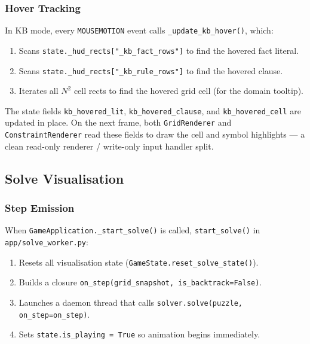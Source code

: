 \subsubsection{Hover Tracking}

In KB mode, every \texttt{MOUSEMOTION} event calls
\texttt{\_update\_kb\_hover()}, which:
\begin{enumerate}
  \item Scans \texttt{state.\_hud\_rects["\_kb\_fact\_rows"]} to find
        the hovered fact literal.
  \item Scans \texttt{state.\_hud\_rects["\_kb\_rule\_rows"]} to find
        the hovered clause.
  \item Iterates all $N^2$ cell rects to find the hovered grid cell (for the
        domain tooltip).
\end{enumerate}

The state fields \texttt{kb\_hovered\_lit}, \texttt{kb\_hovered\_clause}, and
\texttt{kb\_hovered\_cell} are updated in place.
On the next frame, both \texttt{GridRenderer} and \texttt{ConstraintRenderer}
read these fields to draw the cell and symbol highlights — a clean
read-only renderer / write-only input handler split.

\subsection{Solve Visualisation}
\label{sec:ui_solve}

\subsubsection{Step Emission}

When \texttt{GameApplication.\_start\_solve()} is called, \texttt{start\_solve()}
in \texttt{app/solve\_worker.py}:

\begin{enumerate}
  \item Resets all visualisation state (\texttt{GameState.reset\_solve\_state()}).
  \item Builds a closure \texttt{on\_step(grid\_snapshot, is\_backtrack=False)}.
  \item Launches a daemon thread that calls \texttt{solver.solve(puzzle,
        on\_step=on\_step)}.
  \item Sets \texttt{state.is\_playing = True} so animation begins immediately.
\end{enumerate}

